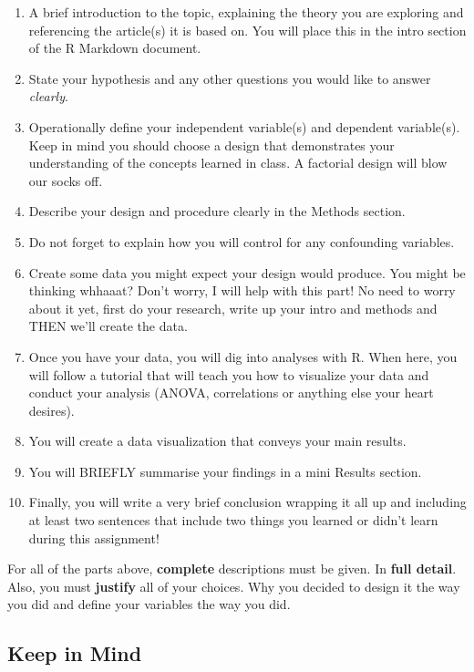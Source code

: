 \documentclass[
]{html}
\providecommand{\tightlist}{%
  \setlength{\itemsep}{0pt}\setlength{\parskip}{0pt}}
\theoremstyle{definition}
\theoremstyle{definition}
\theoremstyle{definition}
\theoremstyle{definition}
\theoremstyle{remark}
\begin{document}
\begin{enumerate}
\def\labelenumi{\arabic{enumi}.}
\tightlist
\item
  A brief introduction to the topic, explaining the theory you are exploring and referencing the article(s) it is based on. You will place this in the intro section of the R Markdown document.
\item
  State your hypothesis and any other questions you would like to answer \emph{clearly}.
\item
  Operationally define your independent variable(s) and dependent variable(s). Keep in mind you should choose a design that demonstrates your understanding of the concepts learned in class. A factorial design will blow our socks off.
\item
  Describe your design and procedure clearly in the Methods section.
\item
  Do not forget to explain how you will control for any confounding variables.
\item
  Create some data you might expect your design would produce. You might be thinking whhaaat? Don't worry, I will help with this part! No need to worry about it yet, first do your research, write up your intro and methods and THEN we'll create the data.
\item
  Once you have your data, you will dig into analyses with R. When here, you will follow a tutorial that will teach you how to visualize your data and conduct your analysis (ANOVA, correlations or anything else your heart desires).
\item
  You will create a data visualization that conveys your main results.
\item
  You will BRIEFLY summarise your findings in a mini Results section.
\item
  Finally, you will write a very brief conclusion wrapping it all up and including at least two sentences that include two things you learned or didn't learn during this assignment!
\end{enumerate}

For all of the parts above, \textbf{complete} descriptions must be given. In \textbf{full detail}. Also, you must \textbf{justify} all of your choices. Why you decided to design it the way you did and define your variables the way you did.

\hypertarget{keep-in-mind}{%
\subsection{Keep in Mind}\label{keep-in-mind}}
\end{document}

